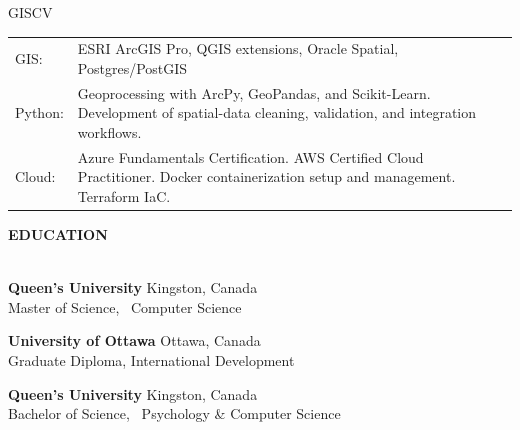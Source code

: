 \documentclass[letterpaper]{article}
\newcommand{\lineunder} {
        \vspace*{-8pt} \\
        \hspace*{-18pt} \hrulefill \\
    }
\newcommand{\header} [1] {
        \vspace{9pt}
        {\hspace*{-18pt}\vspace*{6pt} \large \textbf {#1}}
        \vspace*{-6pt} \lineunder
        \vspace{2pt}
    }
\newcommand{\university}[3]{
        \textbf{#1}  %
        \hfill #2\\  %
        #3\\         %
        \vspace{2mm}
    }
\newenvironment{skillslist}
        {
            \begin{tabular}[t]{ l L{5.17in} }
        }{
            \end{tabular}
        }
\begin{document}
    \begin{taggedblock}{GISCV}
        \begin{skillslist}
            GIS:&
                ESRI ArcGIS Pro, QGIS extensions, Oracle Spatial, Postgres/PostGIS
                \\
            Python:&
                Geoprocessing with ArcPy, GeoPandas, and Scikit-Learn. \linebreak
                Development of spatial-data cleaning, validation, and integration workflows.
                \\
             Cloud:&
                 Azure Fundamentals Certification. \linebreak
                 AWS Certified Cloud Practitioner. \linebreak
                 Docker containerization setup and management.
                 Terraform IaC.
                 \\
        \end{skillslist}
    \end{taggedblock}



\header{EDUCATION}
    \university
        {Queen's University}
        {Kingston, Canada}
        {Master of Science, ~Computer Science}

    \university
        {University of Ottawa}
        {Ottawa, Canada}
        {Graduate Diploma, International Development}

    \university
        {Queen's University}
        {Kingston, Canada}
        {Bachelor of Science, ~Psychology \& Computer Science}
\end{document}
